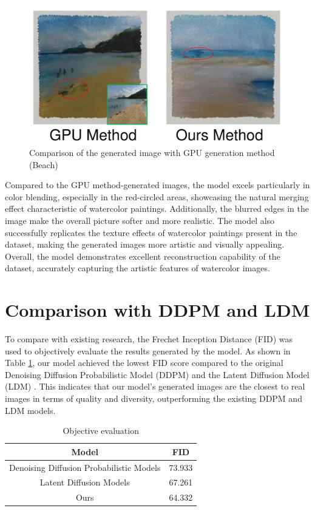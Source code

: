 \documentclass[12pt]{report}
\begin{document}
\begin{figure}[htbp]
    \centering
    \includegraphics[width=13cm]{image/wGPU.pdf}
    \caption{Comparison of the generated image with GPU generation method (Beach)}
    \label{fig:wGPU}
\end{figure}

Compared to the GPU method-generated images, the model excels particularly in color blending, especially in the red-circled areas, showcasing the natural merging effect characteristic of watercolor paintings. Additionally, the blurred edges in the image make the overall picture softer and more realistic. The model also successfully replicates the texture effects of watercolor paintings present in the dataset, making the generated images more artistic and visually appealing. Overall, the model demonstrates excellent reconstruction capability of the dataset, accurately capturing the artistic features of watercolor images.
\section{Comparison with DDPM and LDM}

To compare with existing research, the Frechet Inception Distance (FID) \cite{FID} was used to objectively evaluate the results generated by the model. As shown in Table \ref{tab:fid}, our model achieved the lowest FID score compared to the original Denoising Diffusion Probabilistic Model (DDPM) \cite{ho2020denoising} and the Latent Diffusion Model (LDM) \cite{rombach2022high}. This indicates that our model's generated images are the closest to real images in terms of quality and diversity, outperforming the existing DDPM and LDM models.

\begin{table}[htbp]
  \centering
  \caption{Objective evaluation}
  \label{tab:fid}
  \begin{tabular}{c c}
    \hline
    Model & FID  \\
    \hline
    Denoising Diffusion Probabilistic Models & 73.933  \\
    Latent Diffusion Models & 67.261\\
    Ours & 64.332  \\
    \hline
  \end{tabular}
\end{table}
\end{document}
